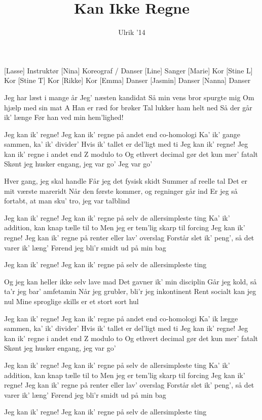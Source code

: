\documentclass[a4paper,11pt]{article}
\title{Kan Ikke Regne}
\author{Ulrik '14}
\begin{document}
\maketitle

\begin{roles}
[Lasse] Instruktør
[Nina] Koreograf / Danser
[Line] Sanger
[Marie] Kor
[Stine L] Kor
[Stine T] Kor
[Rikke] Kor
[Emma] Danser
[Jasmin] Danser
[Nanna] Danser
\end{roles}

\begin{song}
 Jeg har læst i mange år
Jeg' næsten kandidat
Så min vens bror spurgte mig
Om hjælp med sin mat A
Han er ræd for brøker
Tal lukker ham helt ned
Så der går ik' længe
Før han ved min hem'lighed!

Jeg kan ik' regne!
Jeg kan ik' regne på andet end co-homologi
Ka' ik' gange sammen, ka' ik' divider'
Hvis ik' tallet er del'ligt med ti
Jeg kan ik' regne!
Jeg kan ik' regne i andet end Z modulo to
Og ethvert decimal gør det kun mer' fatalt
Skønt jeg husker engang, jeg var go'
Jeg var go'

Hver gang, jeg skal handle
Får jeg det fysisk skidt
Summer af reelle tal
Det er mit værste mareridt
Når den første kommer, og regninger går ind
Er jeg så fortabt, at man sku' tro, jeg var talblind

Jeg kan ik' regne!
Jeg kan ik' regne på selv de allersimpleste ting
Ka' ik' addition, kan knap tælle til to
Men jeg er tem'lig skarp til forcing
Jeg kan ik' regne!
Jeg kan ik' regne på renter eller lav' overslag
Forstår slet ik' peng', så det varer ik' læng'
Førend jeg bli'r smidt ud på min bag

Jeg kan ik' regne!
Jeg kan ik' regne på selv de allersimpleste ting

Og jeg kan heller ikke selv lave mad
Det gavner ik' min disciplin
Går jeg kold, så ta'r jeg bar' amfetamin
Når jeg grubler, bli'r jeg inkontinent
Rent socialt kan jeg nul
Mine sproglige skills er et stort sort hul

Jeg kan ik' regne!
Jeg kan ik' regne på andet end co-homologi
Ka' ik lægge sammen, ka' ik' divider'
Hvis ik' tallet er del'ligt med ti
Jeg kan ik' regne!
Jeg kan ik' regne i andet end Z modulo to
Og ethvert decimal gør det kun mer' fatalt
Skønt jeg husker engang, jeg var go'

Jeg kan ik' regne!
Jeg kan ik' regne på selv de allersimpleste ting
Ka' ik' addition, kan knap tælle til to
Men jeg er tem'lig skarp til forcing
Jeg kan ik' regne!
Jeg kan ik' regne på renter eller lav' overslag
Forstår slet ik' peng', så det varer ik' læng'
Førend jeg bli'r smidt ud på min bag

Jeg kan ik' regne!
Jeg kan ik' regne på selv de allersimpleste ting
\end{song}
\end{document}

